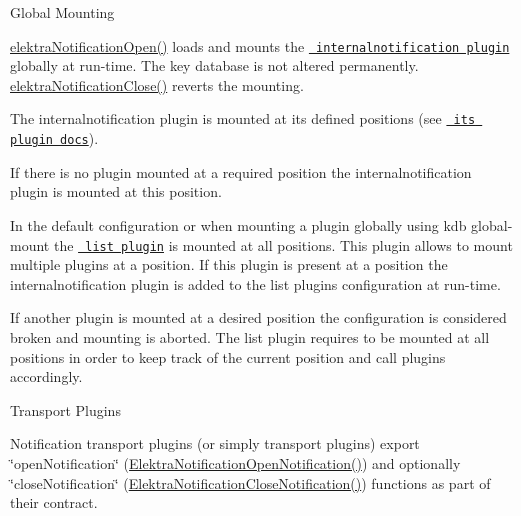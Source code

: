 \begin{DoxyParagraph}{Global Mounting}

\end{DoxyParagraph}
\mbox{\hyperlink{group__kdbnotification_gaeae96154abdb5fdbf1b34a01e2b23e44}{elektra\+Notification\+Open()}} loads and mounts the \href{https://www.libelektra.org/plugins/internalnotification}{\texttt{ internalnotification plugin}} globally at run-\/time. The key database is not altered permanently. \mbox{\hyperlink{group__kdbnotification_ga5685dafbd4131011365628d6d9213594}{elektra\+Notification\+Close()}} reverts the mounting.

The internalnotification plugin is mounted at its defined positions (see \href{https://www.libelektra.org/plugins/internalnotification}{\texttt{ its plugin docs}}).


\begin{DoxyItemize}
\item If there is no plugin mounted at a required position the internalnotification plugin is mounted at this position.
\item In the default configuration or when mounting a plugin globally using {\ttfamily kdb global-\/mount} the \href{https://www.libelektra.org/plugins/list}{\texttt{ list plugin}} is mounted at all positions. This plugin allows to mount multiple plugins at a position. If this plugin is present at a position the internalnotification plugin is added to the list plugin\textquotesingle{}s configuration at run-\/time.
\item If another plugin is mounted at a desired position the configuration is considered broken and mounting is aborted. The list plugin requires to be mounted at all positions in order to keep track of the current position and call plugins accordingly.
\end{DoxyItemize}

\begin{DoxyParagraph}{Transport Plugins}

\end{DoxyParagraph}
Notification transport plugins (or simply transport plugins) export \char`\"{}open\+Notification\char`\"{} (\mbox{\hyperlink{kdbnotificationinternal_8h_adf7cf73a2740a3852b73d607b911a254}{Elektra\+Notification\+Open\+Notification()}}) and optionally \char`\"{}close\+Notification\char`\"{} (\mbox{\hyperlink{kdbnotificationinternal_8h_adc260d2c576df585aaa965cf97bc9284}{Elektra\+Notification\+Close\+Notification()}}) functions as part of their contract.

